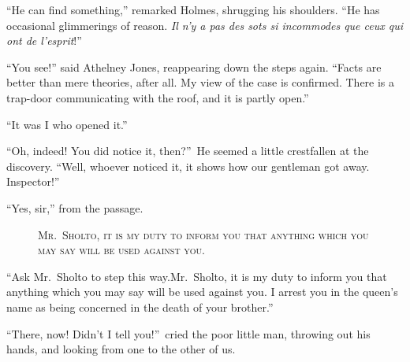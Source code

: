 \documentclass[12pt,english,oneside]{book}
\newcommand{\noun}[1]{\textsc{#1}}
\begin{document}
{}``He can find something,'' remarked Holmes, shrugging his shoulders.
{}``He has occasional glimmerings of reason. \emph{Il n'y a pas des
sots si incommodes que ceux qui ont de l'esprit}!''

{}``You see!'' said Athelney Jones, reappearing down the steps again.
{}``Facts are better than mere theories, after all. My view of the
case is confirmed. There is a trap-door communicating with the roof,
and it is partly open.''

{}``It was I who opened it.''

{}``Oh, indeed! You did notice it, then?''\ He seemed a little
crestfallen at the discovery. {}``Well, whoever noticed it, it shows
how our gentleman got away. Inspector!''

{}``Yes, sir,'' from the passage.

%
\begin{figure}[htbp]
\noindent {}

\noindent \begin{center}\noun{Mr.\ Sholto, it is my duty to inform
you that anything which you may say will be used against you.}\end{center}
\end{figure}
{}``Ask Mr.\ Sholto to step this way.\mdsh{---}Mr.\ Sholto, it
is my duty to inform you that anything which you may say will be used
against you. I arrest you in the queen's name as being concerned in
the death of your brother.''

{}``There, now! Didn't I tell you!''\ cried the poor little man,
throwing out his hands, and looking from one to the other of us.
\end{document}
